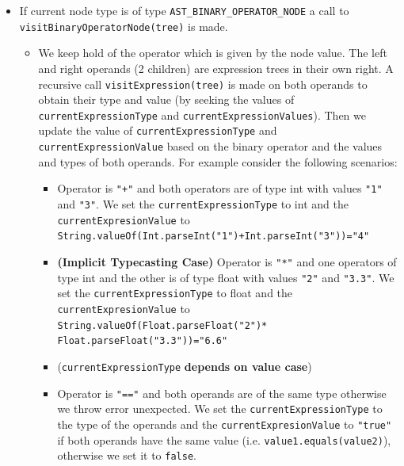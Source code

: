 \begin{itemize}
	\item If current node type is of type \verb!AST_BINARY_OPERATOR_NODE! a call to \verb!visitBinaryOperatorNode(tree)! is made. 
	      \begin{itemize}
	      	\item  We keep hold of the operator which is given by the node value. The left and right operands (2 children) are expression trees in their own right. A recursive call \verb!visitExpression(tree)! is made on both operands to obtain their type and value (by seeking the values of \verb!currentExpressionType! and \verb!currentExpressionValues!). Then we update the value of \verb!currentExpressionType! and \verb!currentExpressionValue! based on the binary operator and the values and types of both operands. For example consider the following scenarios:
	      	      \begin{itemize}
	      	      	\item Operator is \verb!"+"! and both operators are of type int with values \verb!"1"! and \verb!"3"!. We set the \verb!currentExpressionType! to int and the \verb!currentExpresionValue! to \verb!String.valueOf(Int.parseInt("1")+Int.parseInt("3"))="4"!
	      	      	\item \textbf{(Implicit Typecasting Case)} Operator is \verb!"*"! and one  operators  of type int  and the other is of type float with values \verb!"2"! and \verb!"3.3"!. We set the \verb!currentExpressionType! to float and the \verb!currentExpresionValue! to \verb!String.valueOf(Float.parseFloat("2")*!
	      	      	      \verb!Float.parseFloat("3.3"))="6.6"!
	      	      	\item (\verb!currentExpressionType! \textbf{depends on value case})
	      	      	\item Operator is \verb!"=="! and both operands are of the same type otherwise we throw error unexpected. We set the \verb!currentExpressionType! to the type of the operands and the \verb!currentExpresionValue! to \verb!"true"! if both operands have the same value (i.e. \verb!value1.equals(value2)!), otherwise we set it to \verb!false!.
	      	      \end{itemize}
	      \end{itemize}
	      	      	       

\end{itemize}
